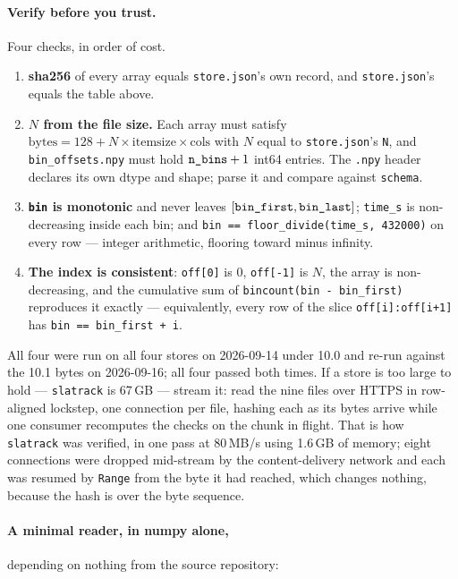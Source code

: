 \documentclass[10pt]{article}
\newcommand{\code}[1]{\texttt{#1}}
\begin{document}
\paragraph{Verify before you trust.} Four checks, in order of cost.
\begin{enumerate}\itemsep1pt
\item \textbf{sha256} of every array equals \code{store.json}'s own record, and \code{store.json}'s equals the table above.
\item \textbf{$N$ from the file size.} Each array must satisfy
$\mathrm{bytes} = 128 + N \times \mathrm{itemsize} \times \mathrm{cols}$ with
$N$ equal to \code{store.json}'s \code{N}, and \code{bin\_offsets.npy} must
hold $\text{\code{n\_bins}} + 1$ int64 entries. The \code{.npy} header declares
its own dtype and shape; parse it and compare against \code{schema}.
\item \textbf{\code{bin} is monotonic} and never leaves $[\text{\code{bin\_first}}, \text{\code{bin\_last}}]$; \code{time\_s} is non-decreasing inside each bin; and \code{bin == floor\_divide(time\_s, 432000)} on every row --- integer arithmetic, flooring toward minus infinity.
\item \textbf{The index is consistent}: \code{off[0]} is 0, \code{off[-1]} is
$N$, the array is non-decreasing, and the cumulative sum of
\code{bincount(bin - bin\_first)} reproduces it exactly --- equivalently, every
row of the slice \code{off[i]:off[i+1]} has \code{bin == bin\_first + i}.
\end{enumerate}
All four were run on all four stores on 2026-09-14 under 10.0 and re-run
against the 10.1 bytes on 2026-09-16; all four passed both times. If a
store is too large to hold --- \code{slatrack} is 67\,GB --- stream it: read the
nine files over HTTPS in row-aligned lockstep, one connection per file, hashing
each as its bytes arrive while one consumer recomputes the checks on the chunk
in flight. That is how \code{slatrack} was verified, in one pass at 80\,MB/s
using 1.6\,GB of memory; eight connections were dropped mid-stream by the
content-delivery network and each was resumed by \code{Range} from the byte it
had reached, which changes nothing, because the hash is over the byte sequence.

\paragraph{A minimal reader, in numpy alone,} depending on nothing from the source repository:
\end{document}
